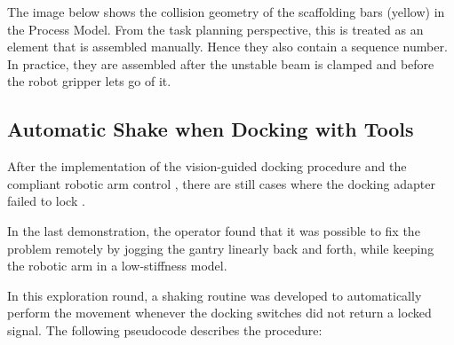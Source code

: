 The image below shows the collision geometry of the scaffolding bars (yellow) in the Process Model. From the task planning perspective, this is treated as an element that is assembled manually. Hence they also contain a sequence number. In practice, they are assembled after the unstable beam is clamped and before the robot gripper lets go of it.




\subsection{Automatic Shake when Docking with Tools}
\label{subsection:exploration_5_automatic_shake_when_docking_with_tools}

After the implementation of the vision-guided docking procedure  and the compliant robotic arm control , there are still cases where the docking adapter failed to lock .

In the last demonstration, the operator found that it was possible to fix the problem remotely by jogging the gantry linearly back and forth, while keeping the robotic arm in a low-stiffness model. 

In this exploration round, a shaking routine was developed to automatically perform the movement whenever the docking switches did not return a locked signal. The following pseudocode describes the procedure:

